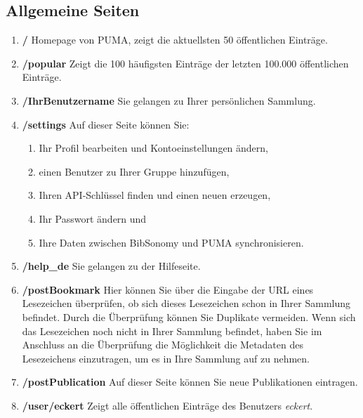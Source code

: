 \subsection{Allgemeine Seiten}
\label{subsec:allgemeineSeiten}
\begin{enumerate}
    \item \textbf{/} \newline
    Homepage von PUMA, zeigt die aktuellsten 50 öffentlichen Einträge.
    \item \textbf{/popular} \newline
    Zeigt die 100 häufigsten Einträge der letzten 100.000 öffentlichen Einträge.
    \item \textbf{/IhrBenutzername} \newline
    Sie gelangen zu Ihrer persönlichen Sammlung.
    \item \textbf{/settings} \newline
    Auf dieser Seite können Sie:
    \begin{enumerate}
        \item Ihr Profil bearbeiten und Kontoeinstellungen ändern,
        \item einen Benutzer zu Ihrer Gruppe hinzufügen,
        \item Ihren API-Schlüssel finden und einen neuen erzeugen,
        \item Ihr Passwort ändern und
        \item Ihre Daten zwischen BibSonomy und PUMA synchronisieren.
    \end{enumerate}
    \item \textbf{/help\_de} \newline
    Sie gelangen zu der Hilfeseite.
    \item \textbf{/postBookmark} \newline
    Hier können Sie über die Eingabe der URL eines Lesezeichen überprüfen, ob sich dieses Lesezeichen schon in Ihrer Sammlung befindet. Durch die Überprüfung können Sie Duplikate vermeiden. Wenn sich das Lesezeichen noch nicht in Ihrer Sammlung befindet, haben Sie im Anschluss an die Überprüfung die Möglichkeit die Metadaten des Lesezeichens einzutragen, um es in Ihre Sammlung auf zu nehmen.
    \item \textbf{/postPublication} \newline
    Auf dieser Seite können Sie neue Publikationen eintragen. 
    \item \textbf{/user/eckert} \newline
    Zeigt alle öffentlichen Einträge des Benutzers \textit{eckert}.

\end{enumerate}
